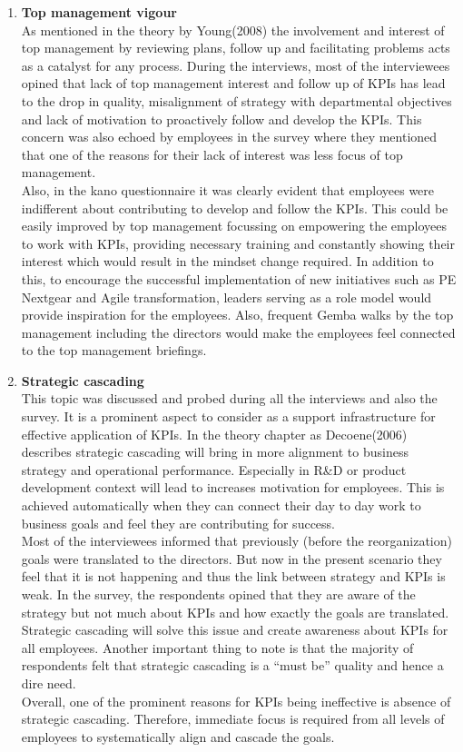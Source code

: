 \begin{enumerate}
\begin{enumerate}
    \item \textbf{Top management vigour}\\
    As mentioned in the theory by Young(2008) the involvement and interest of top management by reviewing plans, follow up and facilitating problems acts as a catalyst for any process. During the interviews, most of the interviewees opined that lack of top management interest and follow up of KPIs has lead to the drop in quality, misalignment of strategy with departmental objectives and lack of motivation to proactively follow and develop the KPIs. This concern was also echoed by employees in the survey where they mentioned that one of the reasons for their lack of interest was less focus of top management.\\ 
    Also, in the kano questionnaire it was clearly evident that employees were indifferent about contributing to develop and follow the KPIs. This could be easily improved by top management focussing on empowering the employees to work with KPIs, providing necessary training and constantly showing their interest which would result in the mindset change required. In addition to this, to encourage the successful implementation of new initiatives such as PE Nextgear and Agile transformation, leaders serving as a role model would provide inspiration for the employees. Also, frequent Gemba walks by the top management including the directors would make the employees feel connected to the top management briefings.\\
    
    \item \textbf{Strategic cascading}\\
    This topic was discussed and probed during all the interviews and also the survey. It is a prominent aspect to consider as a support infrastructure for effective application of KPIs. In the theory chapter as Decoene(2006) describes strategic cascading will bring in more alignment to business strategy and operational performance. Especially in R&D or product development context will lead to increases motivation for employees. This is achieved automatically when they can connect their day to day work to business goals and feel they are contributing for success.\\
    Most of the interviewees informed that previously (before the reorganization) goals were translated to the directors. But now in the present scenario they feel that it is not happening and thus the link between strategy and KPIs is weak. In the survey, the respondents opined that they are aware of the strategy but not much about KPIs and how exactly the goals are translated. Strategic cascading will solve this issue and create awareness about KPIs for all employees. Another important thing to note is that the majority of respondents felt that strategic cascading is a “must be” quality and hence a dire need. \\
    Overall, one of the prominent reasons for KPIs being ineffective is absence of strategic cascading. Therefore, immediate focus is required from all levels of employees to systematically align and cascade the goals.\\
    

\end{enumerate}
\end{enumerate}
